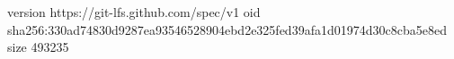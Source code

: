 version https://git-lfs.github.com/spec/v1
oid sha256:330ad74830d9287ea93546528904ebd2e325fed39afa1d01974d30c8cba5e8ed
size 493235
